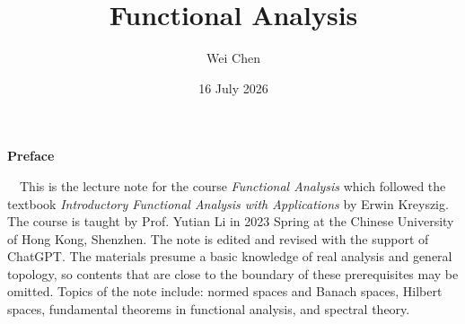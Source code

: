 \documentclass[11pt,oneside]{book}
\title{\Huge \textbf{Functional Analysis}}
\author{Wei Chen}
\date{16 July 2026}
\theoremstyle{plain}
\theoremstyle{definition}
\theoremstyle{remark}
\begin{document}
\maketitle
\allowdisplaybreaks
	\setcounter{page}{1}
	\begin{center}
		\Large\textbf{Preface} 

        
        
    \end{center}~\
        This is the lecture note for the course \textit{Functional Analysis} which followed the textbook \textit{Introductory Functional Analysis with Applications} by Erwin Kreyszig. The course is taught by Prof. Yutian Li in 2023 Spring at the Chinese University of Hong Kong, Shenzhen. The note is edited and revised with the support of ChatGPT. The materials presume a basic knowledge of real analysis and general topology, so contents that are close to the boundary of these prerequisites may be omitted. Topics of the note include: normed spaces and Banach spaces, Hilbert spaces, fundamental theorems in functional analysis, and spectral theory.
	\newpage
	\tableofcontents

\mainmatter





\end{document}
